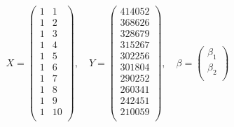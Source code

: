 	\begin{equation*}\begin{split} %
		X = \begin{pmatrix}
			1 & 1 \\
			1 & 2 \\
			1 & 3 \\
			1 & 4 \\
			1 & 5 \\
			1 & 6 \\
			1 & 7 \\
			1 & 8 \\
			1 & 9 \\
			1 & 10 \\
		\end{pmatrix},\quad Y = \begin{pmatrix}
			414052 \\
			368626 \\
			328679 \\
			315267 \\
			302256 \\
			301804 \\
			290252 \\
			260341 \\
			242451 \\
			210059 \\
		\end{pmatrix},\quad \beta = \begin{pmatrix}
			\beta_1 \\
			\beta_2 \\
		\end{pmatrix}
	\end{split}\end{equation*} %
